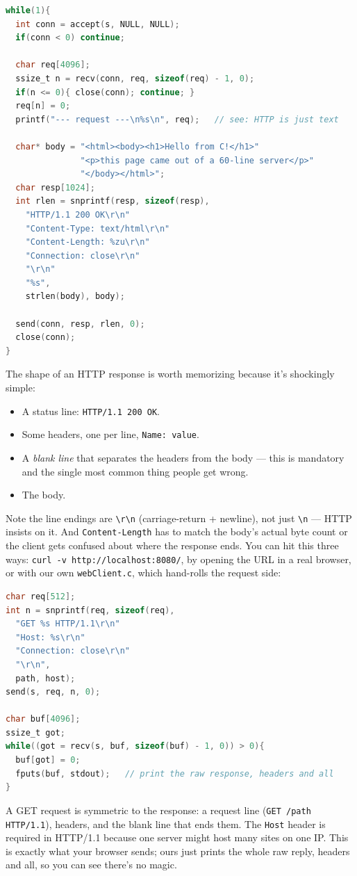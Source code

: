 \documentclass[11pt]{article}
\begin{document}
\begin{lstlisting}[language=C]
while(1){
  int conn = accept(s, NULL, NULL);
  if(conn < 0) continue;

  char req[4096];
  ssize_t n = recv(conn, req, sizeof(req) - 1, 0);
  if(n <= 0){ close(conn); continue; }
  req[n] = 0;
  printf("--- request ---\n%s\n", req);   // see: HTTP is just text

  char* body = "<html><body><h1>Hello from C!</h1>"
               "<p>this page came out of a 60-line server</p>"
               "</body></html>";
  char resp[1024];
  int rlen = snprintf(resp, sizeof(resp),
    "HTTP/1.1 200 OK\r\n"
    "Content-Type: text/html\r\n"
    "Content-Length: %zu\r\n"
    "Connection: close\r\n"
    "\r\n"
    "%s",
    strlen(body), body);

  send(conn, resp, rlen, 0);
  close(conn);
}
\end{lstlisting}

The shape of an HTTP response is worth memorizing because it's
shockingly simple:
\begin{itemize}
  \item A status line: \texttt{HTTP/1.1 200 OK}.
  \item Some headers, one per line, \texttt{Name: value}.
  \item A \emph{blank line} that separates the headers from the body
    --- this is mandatory and the single most common thing people
    get wrong.
  \item The body.
\end{itemize}
Note the line endings are \verb|\r\n| (carriage-return + newline),
not just \verb|\n| --- HTTP insists on it. And
\texttt{Content-Length} has to match the body's actual byte count or
the client gets confused about where the response ends. You can hit
this three ways: \texttt{curl -v http://localhost:8080/}, by opening
the URL in a real browser, or with our own \texttt{webClient.c},
which hand-rolls the request side:

\begin{lstlisting}[language=C]
char req[512];
int n = snprintf(req, sizeof(req),
  "GET %s HTTP/1.1\r\n"
  "Host: %s\r\n"
  "Connection: close\r\n"
  "\r\n",
  path, host);
send(s, req, n, 0);

char buf[4096];
ssize_t got;
while((got = recv(s, buf, sizeof(buf) - 1, 0)) > 0){
  buf[got] = 0;
  fputs(buf, stdout);   // print the raw response, headers and all
}
\end{lstlisting}

A GET request is symmetric to the response: a request line
(\texttt{GET /path HTTP/1.1}), headers, and the blank line that ends
them. The \texttt{Host} header is required in HTTP/1.1 because one
server might host many sites on one IP. This is exactly what your
browser sends; ours just prints the whole raw reply, headers and
all, so you can see there's no magic.
\end{document}
